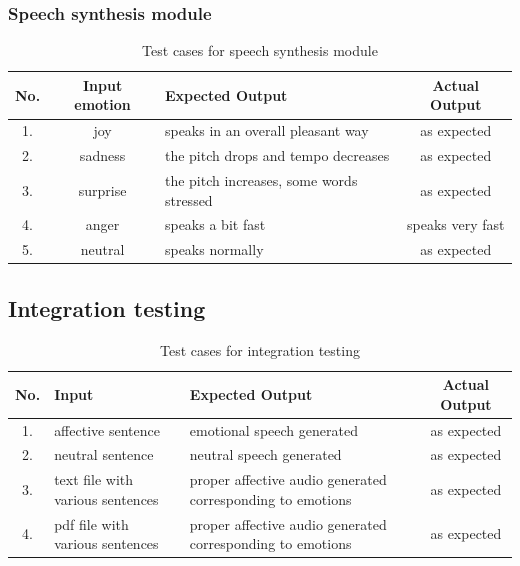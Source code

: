 \documentclass[oneside,a4paper,12pt]{book}
\begin{document}
\begin{appendices}
\subsubsection{Speech synthesis module}
\begin{table}[!htbp]
	\def\arraystretch{1.5}
	\begin{tabularx}{\textwidth}{|c|c|X|c|}
		\hline 
		No. & Input emotion	& Expected Output & Actual Output \\ \hline
		1. & joy& speaks in an overall pleasant way & as expected \\ \hline
		2. & sadness & the pitch drops and tempo decreases & as expected \\ \hline
		3. & surprise & the pitch increases, some words stressed & as expected \\ \hline
		4. & anger & speaks a bit fast & speaks very fast \\ \hline
		5. & neutral & speaks normally & as expected \\ \hline
	\end{tabularx}
	\caption{Test cases for speech synthesis module}
	\label{tab:testcases}
\end{table}

\subsection{Integration testing}
\begin{table}[!htbp]
	\def\arraystretch{1.5}
	\begin{tabularx}{\textwidth}{|c|X|X|c|}
		\hline 
		No. & Input	& Expected Output & Actual Output \\ \hline
		1. & affective sentence & emotional speech generated & as expected \\ \hline
		2. & neutral sentence & neutral speech generated & as expected \\ \hline
		3. & text file with various sentences & proper affective audio generated corresponding to emotions & as expected \\ \hline
		4. & pdf file with various sentences & proper affective audio generated corresponding to emotions & as expected \\ \hline
	\end{tabularx}
	\caption{Test cases for integration testing}
	\label{tab:testcases}
\end{table}

\newpage

\end{appendices}
\end{document}
